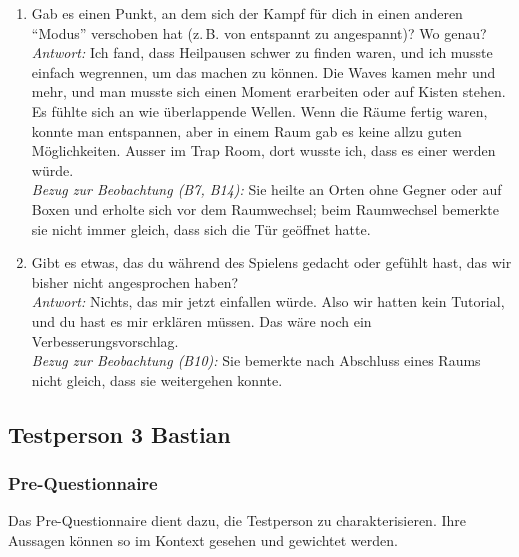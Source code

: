 \documentclass[../Main.tex]{subfiles}
\begin{document}
\begin{enumerate}[label=\textbf{I\arabic*}, leftmargin=1.5cm, itemsep=1em]
    \item Gab es einen Punkt, an dem sich der Kampf für dich in einen anderen \enquote{Modus} verschoben hat (z.\,B. von entspannt zu angespannt)? Wo genau? \\
    \textit{Antwort:} Ich fand, dass Heilpausen schwer zu finden waren, und ich musste einfach wegrennen, um das machen zu können. Die Waves kamen mehr und mehr, und man musste sich einen Moment erarbeiten oder auf Kisten stehen. Es fühlte sich an wie überlappende Wellen. Wenn die Räume fertig waren, konnte man entspannen, aber in einem Raum gab es keine allzu guten Möglichkeiten. Ausser im Trap Room, dort wusste ich, dass es einer werden würde. \\
    \textit{Bezug zur Beobachtung (B7, B14):} Sie heilte an Orten ohne Gegner oder auf Boxen und erholte sich vor dem Raumwechsel; beim Raumwechsel bemerkte sie nicht immer gleich, dass sich die Tür geöffnet hatte.

    \item Gibt es etwas, das du während des Spielens gedacht oder gefühlt hast, das wir bisher nicht angesprochen haben? \\
    \textit{Antwort:} Nichts, das mir jetzt einfallen würde. Also wir hatten kein Tutorial, und du hast es mir erklären müssen. Das wäre noch ein Verbesserungsvorschlag. \\
    \textit{Bezug zur Beobachtung (B10):} Sie bemerkte nach Abschluss eines Raums nicht gleich, dass sie weitergehen konnte.
\end{enumerate}

\subsection{Testperson 3 Bastian}

\subsubsection{Pre-Questionnaire}

Das Pre-Questionnaire dient dazu, die Testperson zu charakterisieren. Ihre Aussagen können so im Kontext gesehen und gewichtet werden.
\end{document}
